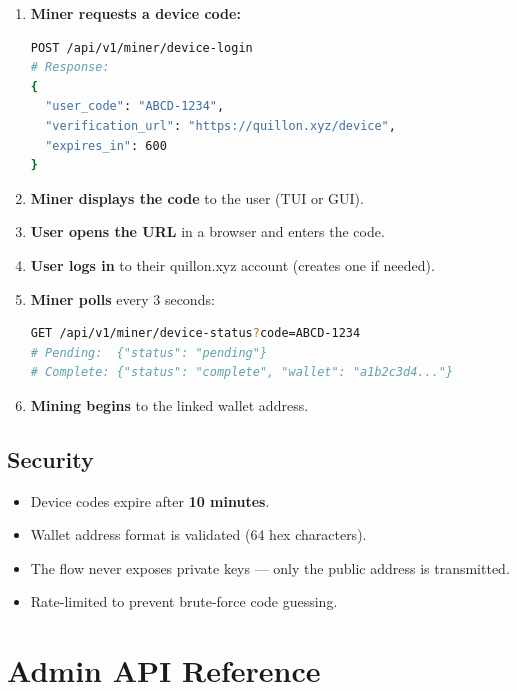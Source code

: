\documentclass[11pt,a4paper]{article}
\begin{document}
\begin{enumerate}
    \item \textbf{Miner requests a device code:}
\begin{lstlisting}[language=bash]
POST /api/v1/miner/device-login
# Response:
{
  "user_code": "ABCD-1234",
  "verification_url": "https://quillon.xyz/device",
  "expires_in": 600
}
\end{lstlisting}

    \item \textbf{Miner displays the code} to the user (TUI or GUI).

    \item \textbf{User opens the URL} in a browser and enters the code.

    \item \textbf{User logs in} to their quillon.xyz account (creates one if needed).

    \item \textbf{Miner polls} every 3 seconds:
\begin{lstlisting}[language=bash]
GET /api/v1/miner/device-status?code=ABCD-1234
# Pending:  {"status": "pending"}
# Complete: {"status": "complete", "wallet": "a1b2c3d4..."}
\end{lstlisting}

    \item \textbf{Mining begins} to the linked wallet address.
\end{enumerate}

\subsection{Security}

\begin{itemize}[nosep]
    \item Device codes expire after \textbf{10 minutes}.
    \item Wallet address format is validated (64 hex characters).
    \item The flow never exposes private keys --- only the public address is transmitted.
    \item Rate-limited to prevent brute-force code guessing.
\end{itemize}

\section{Admin API Reference}
\end{document}
